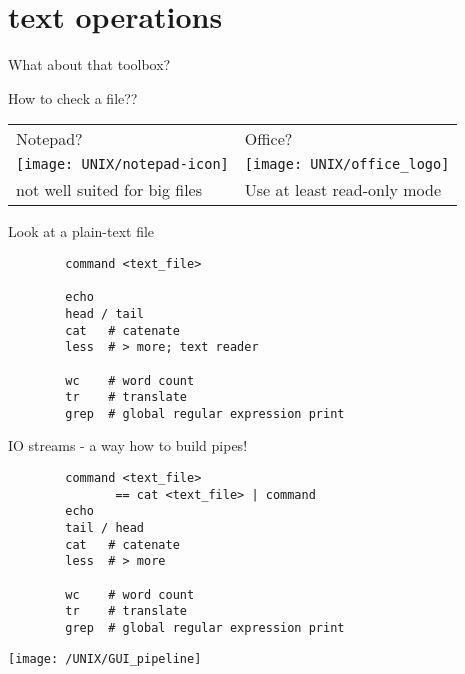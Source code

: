 \documentclass[xcolor=dvipsnames]{beamer}
\begin{document}
\section{text operations}

\begin{frame}
	\Huge
	\begin{center}
		What about that toolbox?
	\end{center}
\end{frame}

\begin{frame}
	\begin{center}
	\huge
	How to check a file?? \\
	\vspace{1cm}

	\Large
	\begin{tabular}{C{0.4\textwidth}C{0.4\textwidth}}
	Notepad? & Office? \\
	\texttt{[image: UNIX/notepad-icon]} & \texttt{[image: UNIX/office\_logo]} \\
	\small not well suited for big files & \small Use at least read-only mode\\
	\end{tabular}
	\end{center}
\end{frame}

\begin{frame}[fragile]
	\huge
	Look at a plain-text file
	\Large
	\begin{verbatim}
		command <text_file>

		echo
		head / tail
		cat   # catenate
		less  # > more; text reader

		wc    # word count
		tr    # translate
		grep  # global regular expression print
	\end{verbatim}
\end{frame}

\begin{frame}[fragile]
	\huge
	IO streams - a way how to build pipes!
	\Large
	\begin{verbatim}
		command <text_file>
	           == cat <text_file> | command
		echo
		tail / head
		cat   # catenate
		less  # > more

		wc    # word count
		tr    # translate
		grep  # global regular expression print
	\end{verbatim}
\end{frame}

\begin{frame}
	\begin{center}
		\texttt{[image: /UNIX/GUI\_pipeline]}
	\end{center}
\end{frame}
\end{document}
